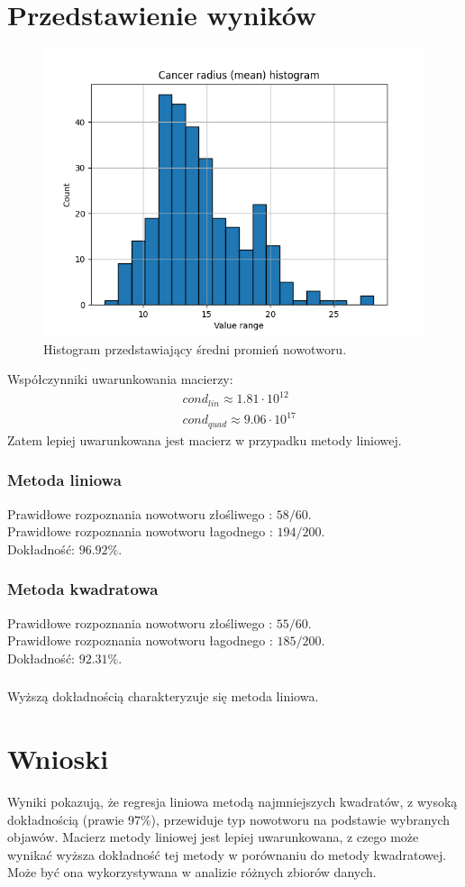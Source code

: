 \documentclass[11pt]{scrartcl}
\begin{document}
    \section{Przedstawienie wyników}
    \begin{figure}[H]
        \centering
        \includegraphics[width=0.8\linewidth]{cancer_radius_hist.png}
        \caption{Histogram przedstawiający średni promień nowotworu.}
    \end{figure}

    Współczynniki uwarunkowania macierzy:
    \begin{align*}
        & cond_{lin} \approx 1.81 \cdot 10^{12} \\
        & cond_{quad} \approx 9.06 \cdot 10^{17}
    \end{align*}
    Zatem lepiej uwarunkowana jest macierz w przypadku metody liniowej.

    \subsubsection*{Metoda liniowa}
    Prawidłowe rozpoznania nowotworu złośliwego : $58/60$. \\
    Prawidłowe rozpoznania nowotworu łagodnego : $194/200$. \\
    Dokładność: $96.92\%$.
    \subsubsection*{Metoda kwadratowa}
    Prawidłowe rozpoznania nowotworu złośliwego : $55/60$. \\
    Prawidłowe rozpoznania nowotworu łagodnego : $185/200$. \\
    Dokładność: $92.31\%$.
    \subsubsection*{}
    Wyższą dokładnością charakteryzuje się metoda liniowa.

    \section{Wnioski}
    Wyniki pokazują, że regresja liniowa metodą najmniejszych kwadratów, z wysoką
    dokładnością (prawie $97\%$), przewiduje typ nowotworu na podstawie wybranych
    objawów. Macierz metody liniowej jest lepiej uwarunkowana, z czego może wynikać
    wyższa dokładność tej metody w porównaniu do metody kwadratowej. Może być ona
    wykorzystywana w analizie różnych zbiorów danych.
\end{document}
